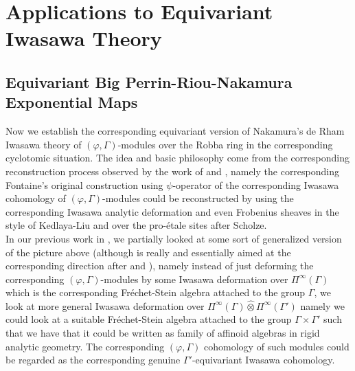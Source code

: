 \documentclass[12pt]{amsart}
\theoremstyle{definition}
\numberwithin{equation}{section}
\begin{document}
\newpage



\section{Applications to Equivariant Iwasawa Theory}

\subsection{Equivariant Big Perrin-Riou-Nakamura Exponential Maps} \label{section5.1}

\indent Now we establish the corresponding equivariant version of Nakamura's de Rham Iwasawa theory \cite{Nakamura1} of $(\varphi,\Gamma)$-modules over the Robba ring in the corresponding cyclotomic situation. The idea and basic philosophy come from the corresponding reconstruction process observed by the work of \cite{KPX} and \cite{KP}, namely the corresponding Fontaine's original construction using $\psi$-operator of the corresponding Iwasawa cohomology of $(\varphi,\Gamma)$-modules could be reconstructed by using the corresponding Iwasawa analytic deformation and even Frobenius sheaves in the style of Kedlaya-Liu \cite{KL15} and \cite{KL16} over the pro-\'etale sites after Scholze.\\


\indent In our previous work in \cite{T1}, we partially looked at some sort of generalized version of the picture above (although \cite{T1} is really and essentially aimed at the corresponding direction after \cite{PZ1} and \cite{CKZ}), namely instead of just deforming the corresponding $(\varphi,\Gamma)$-modules by some Iwasawa deformation over $\Pi^\infty(\Gamma)$ which is the corresponding Fr\'echet-Stein algebra attached to the group $\Gamma$, we look at more general Iwasawa deformation over $\Pi^\infty(\Gamma)\widehat{\otimes}\Pi^\infty(\Gamma')$ namely we could look at a suitable Fr\'echet-Stein algebra attached to the group $\Gamma\times \Gamma'$ such that we have that it could be written as family of affinoid algebras in rigid analytic geometry. The corresponding $(\varphi,\Gamma)$ cohomology of such modules could be regarded as the corresponding genuine $\Gamma'$-equivariant Iwasawa cohomology.\\
\end{document}
